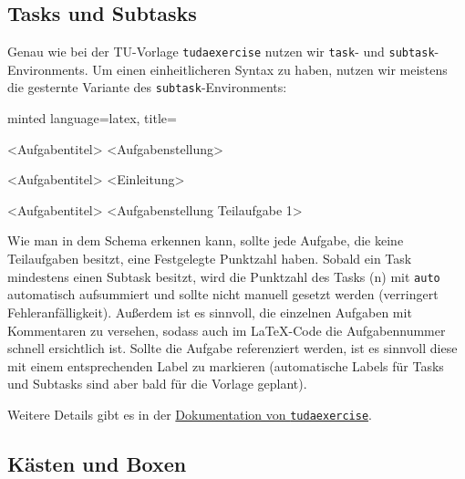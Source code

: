 \documentclass[
    titleprefix=AlgoTeX,
    inlineshortcut=java,
    corporatedesign,
    boxarc,
]{algoexercise}
\begin{document}
    \subsection{Tasks und Subtasks}\label{tasksAndSubtasks}
    \vspace{-1em}
    Genau wie bei der TU-Vorlage \verb+tudaexercise+ nutzen wir \verb+task+- und \verb+subtask+-Environments.
    Um einen einheitlicheren Syntax zu haben, nutzen wir meistens die gesternte Variante des \verb+subtask+-Environments:
    \begin{codeBlock}[]{minted language=latex, title=}
        \begin{task}[points=<n>]{<Aufgabentitel>}\label{ex:H1} %
            <Aufgabenstellung>
        \end{task}
        \begin{task}[points=auto]{<Aufgabentitel>}\label{ex:H2} %
            <Einleitung>
            \begin{subtask*}[points=<n2>]{<Aufgabentitel>}\label{ex:H2.1}
                <Aufgabenstellung Teilaufgabe 1>
            \end{subtask*}
        \end{task}
    \end{codeBlock}

    Wie man in dem Schema erkennen kann, sollte jede Aufgabe, die keine Teilaufgaben besitzt, eine Festgelegte Punktzahl haben. Sobald ein Task mindestens einen Subtask besitzt, wird die Punktzahl des Tasks (n) mit \verb+auto+ automatisch aufsummiert und sollte nicht manuell gesetzt werden (verringert Fehleranfälligkeit). Außerdem ist es sinnvoll, die einzelnen Aufgaben mit Kommentaren zu versehen, sodass auch im \LaTeX-Code die Aufgabennummer schnell ersichtlich ist. Sollte die Aufgabe referenziert werden, ist es sinnvoll diese mit einem entsprechenden Label zu markieren (automatische Labels für Tasks und Subtasks sind aber bald für die Vorlage geplant).

    Weitere Details gibt es in der
    \href{http://mirrors.ctan.org/macros/latex/contrib/tuda-ci/doc/DEMO-TUDaExercise.pdf}{Dokumentation von \texttt{tudaexercise}}.
    \subsection{Kästen und Boxen}\label{boxes}
\end{document}
